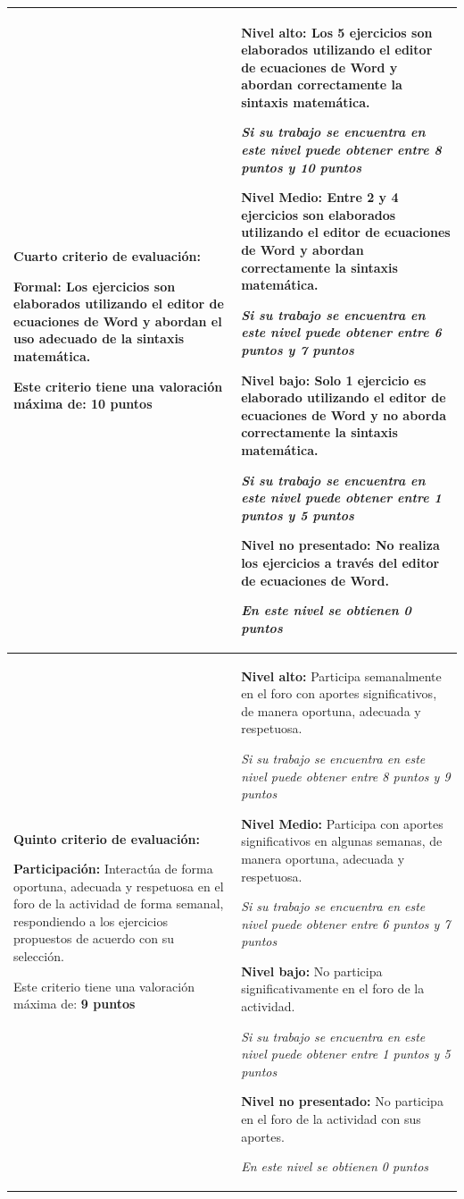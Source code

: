 \documentclass[12pt,letterpaper]{article}
\begin{document}
\begin{tabularx}{\textwidth}{|>{\bfseries}p{4cm}|X|}
\hline
\textbf{Cuarto criterio de evaluación:}

\textbf{Formal:}
Los ejercicios son elaborados utilizando el editor de ecuaciones de Word y abordan el uso adecuado de la sintaxis matemática.

Este criterio tiene una valoración máxima de: \textbf{10 puntos} & 
\textbf{Nivel alto:} Los 5 ejercicios son elaborados utilizando el editor de ecuaciones de Word y abordan correctamente la sintaxis matemática.

\textit{Si su trabajo se encuentra en este nivel puede obtener entre 8 puntos y 10 puntos}

\textbf{Nivel Medio:} Entre 2 y 4 ejercicios son elaborados utilizando el editor de ecuaciones de Word y abordan correctamente la sintaxis matemática.

\textit{Si su trabajo se encuentra en este nivel puede obtener entre 6 puntos y 7 puntos}

\textbf{Nivel bajo:} Solo 1 ejercicio es elaborado utilizando el editor de ecuaciones de Word y no aborda correctamente la sintaxis matemática.

\textit{Si su trabajo se encuentra en este nivel puede obtener entre 1 puntos y 5 puntos}

\textbf{Nivel no presentado:} No realiza los ejercicios a través del editor de ecuaciones de Word.

\textit{En este nivel se obtienen 0 puntos} \\
\hline
\textbf{Quinto criterio de evaluación:}

\textbf{Participación:}
Interactúa de forma oportuna, adecuada y respetuosa en el foro de la actividad de forma semanal, respondiendo a los ejercicios propuestos de acuerdo con su selección.

Este criterio tiene una valoración máxima de: \textbf{9 puntos} & 
\textbf{Nivel alto:} Participa semanalmente en el foro con aportes significativos, de manera oportuna, adecuada y respetuosa.

\textit{Si su trabajo se encuentra en este nivel puede obtener entre 8 puntos y 9 puntos}

\textbf{Nivel Medio:} Participa con aportes significativos en algunas semanas, de manera oportuna, adecuada y respetuosa.

\textit{Si su trabajo se encuentra en este nivel puede obtener entre 6 puntos y 7 puntos}

\textbf{Nivel bajo:} No participa significativamente en el foro de la actividad.

\textit{Si su trabajo se encuentra en este nivel puede obtener entre 1 puntos y 5 puntos}

\textbf{Nivel no presentado:} No participa en el foro de la actividad con sus aportes.

\textit{En este nivel se obtienen 0 puntos} \\
\hline
\end{tabularx}
\end{document}
